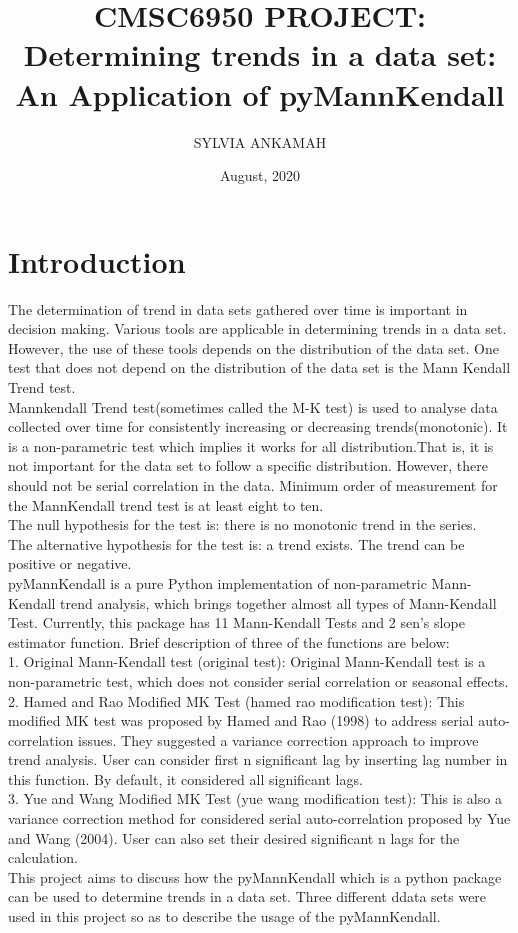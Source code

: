 \documentclass[12pt, letterpaper, twoside]{article}
\title{CMSC6950 PROJECT: 
Determining trends in a data set: An Application of pyMannKendall}
\author{SYLVIA ANKAMAH}
\date{August, 2020}
\begin{document}
\maketitle
\section{Introduction}
The determination of trend in data sets gathered over time is important in decision making. Various tools are applicable in determining trends in a data set. However, the use of these tools depends on the distribution of the data set. One test that does not depend on the distribution of the data set is the Mann Kendall Trend test.\\Mannkendall Trend test(sometimes called the M-K test) is used to analyse data collected over time for consistently increasing or decreasing trends(monotonic). It is a non-parametric test which implies it works for all distribution.That is, it is not important for the data set to follow a specific distribution. However, there should not be serial correlation in the data. Minimum order of measurement for the MannKendall trend test is at least eight to ten. \\
The null hypothesis for the test is: there is no monotonic trend in the series.\\
The alternative hypothesis for the test is: a trend exists. The trend can be positive or negative.\\
pyMannKendall is a pure Python implementation of non-parametric Mann-Kendall trend analysis, which brings together almost all types of Mann-Kendall Test. Currently, this package has 11 Mann-Kendall Tests and 2 sen's slope estimator function. Brief description of three of the functions are below:\\
1. Original Mann-Kendall test (original test): Original Mann-Kendall test is a non-parametric test, which does not consider serial correlation or seasonal effects.\\
2. Hamed and Rao Modified MK Test (hamed rao modification test): This modified MK test was proposed by Hamed and Rao (1998) to address serial auto-correlation issues. They suggested a variance correction approach to improve trend analysis. User can consider first n significant lag by inserting lag number in this function. By default, it considered all significant lags.\\
3. Yue and Wang Modified MK Test (yue wang modification test): This is also a variance correction method for considered serial auto-correlation proposed by Yue and  Wang (2004). User can also set their desired significant n lags for the calculation.\\
This project aims to discuss how the pyMannKendall which is a python package can be used to determine trends in a data set. Three different ddata sets were used in this project so as to describe the usage of the pyMannKendall.\\
\end{document}
